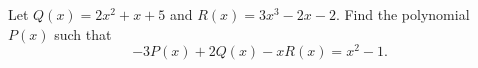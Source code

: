 Let $Q(x)=2x^2+x+5$ and $R(x)=3x^3-2x-2$. Find the polynomial $P(x)$ such that
\[-3P(x)+2Q(x)-xR(x)=x^2-1.\]
